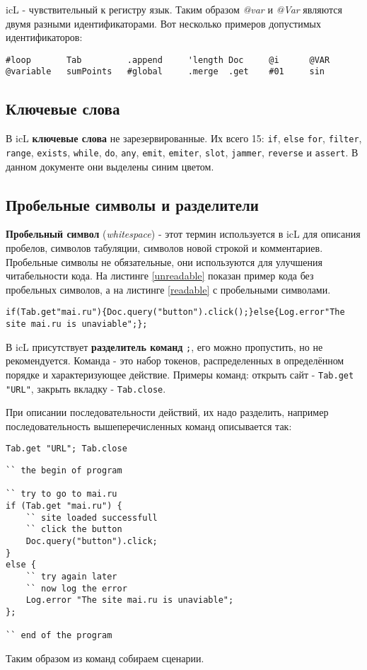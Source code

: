 icL - чувствительный к регистру язык. Таким образом \textit{@var} и \textit{@Var} являются двумя разными идентификаторами. Вот несколько примеров допустимых идентификаторов:

\begin{lstlisting}[numbers=none]
#loop		Tab		    .append		'length	Doc	    @i	 	@VAR
@variable	sumPoints	#global		.merge	.get	#01		sin
\end{lstlisting}

\subsection{Ключевые слова}

В icL \textbf{ключевые слова} не зарезервированные. Их всего 15: \lstinline|if|, \lstinline|else| \lstinline|for|, \lstinline|filter|, \lstinline|range|, \lstinline|exists|, \lstinline|while|, \lstinline|do|, \lstinline|any|, \lstinline|emit|, \lstinline|emiter|, \lstinline|slot|, \lstinline|jammer|, \lstinline|reverse| и \lstinline|assert|. В данном документе они выделены синим цветом.

\subsection{Пробельные символы и разделители}

\textbf{Пробельный символ} (\textit{whitespace}) - этот термин используется в icL для описания пробелов, символов табуляции, символов новой строкой и комментариев. Пробельные символы не обязательные, они используются для улучшения читабельности кода. На листинге \ref{unreadable} показан пример кода без пробельных символов, а на листинге \ref{readable} с пробельными символами.

\begin{lstlisting}[caption=Koд без пробельных символов,label=unreadable]
if(Tab.get"mai.ru"){Doc.query("button").click();}else{Log.error"The site mai.ru is unaviable";};
\end{lstlisting}

В icL присутствует \textbf{разделитель команд} \lstinline|;|, его можно пропустить, но не рекомендуется. Команда - это набор токенов, распределенных в определённом порядке и характеризующее действие. Примеры команд: открыть сайт - \lstinline|Tab.get "URL"|, закрыть вкладку - \lstinline|Tab.close|.

При описании последовательности действий, их надо разделить, например последовательность вышеперечисленных команд описывается так:
\begin{lstlisting}[numbers=none]
Tab.get "URL"; Tab.close
\end{lstlisting}

\begin{lstlisting}[caption=Koд с пробельных символов,label=readable]
`` the begin of program

`` try to go to mai.ru
if (Tab.get "mai.ru") {
	`` site loaded successfull
	`` click the button
	Doc.query("button").click;
}
else {
	`` try again later
	`` now log the error
	Log.error "The site mai.ru is unaviable";
};

`` end of the program
\end{lstlisting}

Таким образом из команд собираем сценарии.
